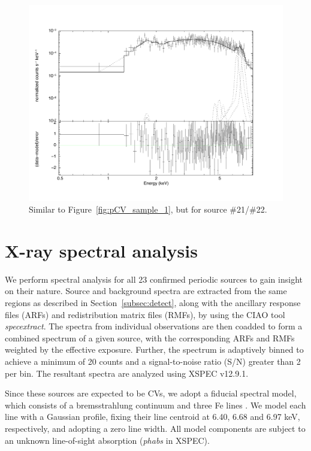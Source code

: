 \documentclass[fleqn,usenatbib]{mnras}
\begin{document}
\begin{figure}
\begin{minipage}[t]{0.45\textwidth}
\includegraphics[width=1.02\textwidth]{./figure/LW/153001_spec.pdf}
\end{minipage}
\caption{Similar to Figure~\ref{fig:pCV_sample_1}, but for source \#21/\#22.}
\label{fig:pCV_sample_2}
\end{figure}

\section{X-ray spectral analysis}\label{sec:spectra}
We perform spectral analysis for all 23 confirmed periodic sources to gain insight on their nature. Source and background spectra are extracted from the same regions as described in Section~\ref{subsec:detect}, along with the ancillary response files (ARFs) and redistribution matrix files (RMFs), by using the CIAO tool \emph{specextract}. 
The spectra from individual observations are then coadded to form a combined spectrum of a given source, with the corresponding ARFs and RMFs weighted by the effective exposure. 
Further, the spectrum is adaptively binned to achieve a minimum of 20 counts and a signal-to-noise ratio (S/N) greater than 2 per bin.
The resultant spectra are analyzed using XSPEC v12.9.1.

Since these sources are expected to be CVs, we adopt a fiducial spectral model, which consists of a bremsstrahlung continuum and three Fe lines \citep{2018ApJS..235...26Z,2019ApJ...882..164X}. 
We model each line with a Gaussian profile, fixing their line centroid at 6.40, 6.68 and 6.97 keV, respectively, and adopting a zero line width. 
All model components are subject to an unknown line-of-sight absorption (\emph{phabs} in XSPEC). 
\end{document}
